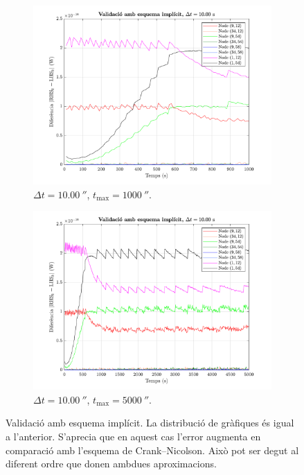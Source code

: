 \begin{figure}[ht]
\begin{subfigure}{.5\textwidth}
		\label{fig:validacio_10}
	\end{subfigure}
	\begin{subfigure}{.5\textwidth}
		\centering
		\includegraphics[width=.95\linewidth]{imagenes/03_validacio/validacio_11.pdf}
		\vspace{-7pt}
		\caption{$\Delta t = 10.00 \ \second$, $t_\text{max} = 1000 \ \second$.}
		\label{fig:validacio_11}
	\end{subfigure}%
	\begin{subfigure}{.5\textwidth}
		\centering
		\includegraphics[width=.95\linewidth]{imagenes/03_validacio/validacio_12.pdf}
		\vspace{-7pt}
		\caption{$\Delta t = 10.00 \ \second$, $t_\text{max} = 5000 \ \second$.}
		\label{fig:validacio_12}
	\end{subfigure}
	\caption{Validació amb esquema implícit. La distribució de gràfiques és igual a l'anterior. S'aprecia que en aquest cas l'error augmenta en comparació amb l'esquema de Crank--Nicolson. Això pot ser degut al diferent ordre que donen ambdues aproximacions.}
	\label{fig:validacio_implicit}
\end{figure}

